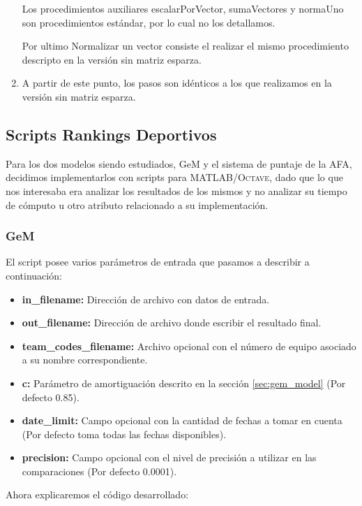 \begin{enumerate}
	Los procedimientos auxiliares escalarPorVector, sumaVectores y normaUno son procedimientos estándar, por lo cual no los detallamos.

	Por ultimo Normalizar un vector consiste el realizar el mismo procedimiento descripto en la versión sin matriz esparza.
	\item A partir de este punto, los pasos son idénticos a los que realizamos en la versión sin matriz esparza.

\end{enumerate}

\subsection{Scripts Rankings Deportivos}

Para los dos modelos siendo estudiados, GeM y el sistema de puntaje de la AFA,
decidimos implementarlos con scripts para \textsc{MATLAB/Octave}, dado que lo que nos
interesaba era analizar los resultados de los mismos y no analizar su tiempo de
cómputo u otro atributo relacionado a su implementación.

\subsubsection{GeM}

El script posee varios parámetros de entrada que pasamos a describir a
continuación:

\begin{itemize}
	\item \textbf{in_filename:} Dirección de archivo con datos de entrada.
	\item \textbf{out_filename:} Dirección de archivo donde escribir el
	resultado final.
	\item \textbf{team_codes_filename:} Archivo opcional con el número de equipo
	asociado a su nombre correspondiente.
	\item \textbf{c:} Parámetro de amortiguación descrito en la
	sección \ref{sec:gem_model} (Por defecto 0.85).
	\item \textbf{date_limit:} Campo opcional con la cantidad de fechas a tomar
	en cuenta (Por defecto toma todas las fechas disponibles).
\item \textbf{precision:} Campo opcional con el nivel de precisión a utilizar en
	las comparaciones (Por defecto 0.0001).
\end{itemize}

Ahora explicaremos el código desarrollado:

